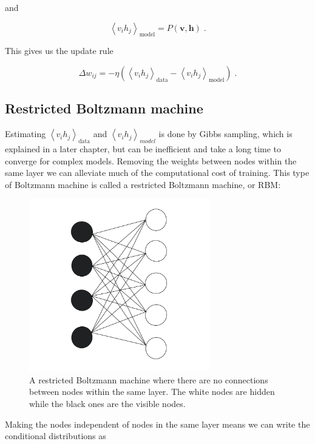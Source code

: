 and

\begin{equation}
    \left < v_i h_j \right >_{\text{model}} = P(\boldsymbol{v}, \boldsymbol{h}) \; .
\end{equation}

This gives us the update rule

\begin{equation}\label{eq:wdiff}
    \Delta w_{ij} = - \eta \left ( \left < v_i h_j \right >_{\text{data}} - \left < v_i h_j \right >_{\text{model}} \right ) \; . 
\end{equation}
\subsection{Restricted Boltzmann machine}
Estimating $ \left < v_i h_j \right >_{\text{data}}$ and $ \left < v_i h_j \right >_{model}$ is done by Gibbs sampling, which is explained in a later chapter, but can be inefficient and take a long time to converge for complex models. Removing the weights between nodes within the same layer we can alleviate much of the computational cost of training. This type of Boltzmann machine is called a restricted Boltzmann machine, or RBM:

\begin{figure}[H]
    \centering
    \includegraphics[width=0.7\textwidth]{Figures/Drawn/machinelearning/boltzrest.pdf}
    \caption{A restricted Boltzmann machine where there are no connections between nodes within the same layer. The white nodes are hidden while the black ones are the visible nodes.}
    \label{fig:boltzrest}
\end{figure}

Making the nodes independent of nodes in the same layer means we can write the conditional distributions as

